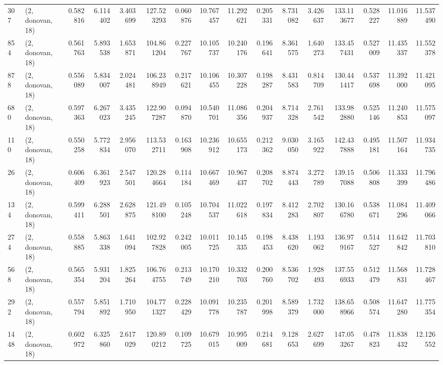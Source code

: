 \begin{tabular}{llrrrrrrrrrrrrrr}
307  &  (2, donovan, 18) &   0.582816 &   6.114402 &   3.403699 &    127.523293 &    0.060876 &   10.767457 &   11.292621 &  0.205331 &   8.731082 &   3.426637 &   133.113677 &   0.528227 &  11.016889 &  11.537490 \\
854  &  (2, donovan, 18) &   0.561763 &   5.893538 &   1.653871 &    104.861204 &    0.227767 &   10.105737 &   10.240176 &  0.196641 &   8.361575 &   1.640273 &   133.457431 &   0.527009 &  11.435337 &  11.552378 \\
878  &  (2, donovan, 18) &   0.556089 &   5.834007 &   2.024481 &    106.238949 &    0.217621 &   10.106455 &   10.307228 &  0.198287 &   8.431583 &   0.814709 &   130.441417 &   0.537698 &  11.392000 &  11.421095 \\
680  &  (2, donovan, 18) &   0.597363 &   6.267023 &   3.435245 &    122.907287 &    0.094870 &   10.540701 &   11.086356 &  0.204937 &   8.714328 &   2.761542 &   133.982880 &   0.525146 &  11.240853 &  11.575097 \\
110  &  (2, donovan, 18) &   0.550258 &   5.772834 &   2.956070 &    113.532711 &    0.163908 &   10.236912 &   10.655173 &  0.212362 &   9.030050 &   3.165922 &   142.437888 &   0.495181 &  11.507164 &  11.934735 \\
26   &  (2, donovan, 18) &   0.606409 &   6.361923 &   2.547501 &    120.284664 &    0.114184 &   10.667469 &   10.967437 &  0.208702 &   8.874443 &   3.272789 &   139.157088 &   0.506808 &  11.333399 &  11.796486 \\
134  &  (2, donovan, 18) &   0.599411 &   6.288501 &   2.628875 &    121.498100 &    0.105248 &   10.704537 &   11.022618 &  0.197834 &   8.412283 &   2.702807 &   130.166780 &   0.538671 &  11.084296 &  11.409066 \\
274  &  (2, donovan, 18) &   0.558885 &   5.863338 &   1.641094 &    102.927828 &    0.242005 &   10.011725 &   10.145335 &  0.198453 &   8.438620 &   1.193062 &   136.979167 &   0.514527 &  11.642842 &  11.703810 \\
568  &  (2, donovan, 18) &   0.565354 &   5.931204 &   1.825264 &    106.764755 &    0.213749 &   10.170210 &   10.332703 &  0.200760 &   8.536702 &   1.928493 &   137.556933 &   0.512479 &  11.568831 &  11.728467 \\
292  &  (2, donovan, 18) &   0.557794 &   5.851892 &   1.710950 &    104.771327 &    0.228429 &   10.091778 &   10.235787 &  0.201998 &   8.589379 &   1.732000 &   138.658966 &   0.508574 &  11.647280 &  11.775354 \\
1448 &  (2, donovan, 18) &   0.602972 &   6.325860 &   2.617029 &    120.890212 &    0.109725 &   10.679015 &   10.995009 &  0.214681 &   9.128653 &   2.627699 &   147.053267 &   0.478823 &  11.838432 &  12.126552 \\

\end{tabular}
